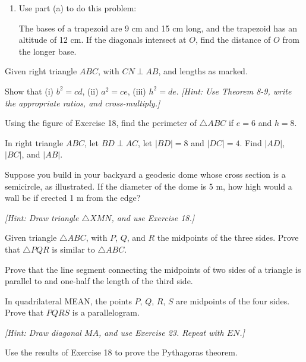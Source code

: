 \documentclass[12pt]{book} %
\begin{document}
\begin{ExerciseList}
\begin{enumerate}
\item[(b)] Use part (a) to do this problem:

The bases of a trapezoid are 9 cm and 15 cm long, and the trapezoid has an altitude of 12 cm. If the diagonals intersect at $O$, find the distance of $O$ from the longer base.
\end{enumerate}


\Exercise Given right triangle $ABC$, with $CN\perp AB$, and lengths as marked.


Show that (i) $b^2=cd$, (ii) $a^2=ce$, (iii) $h^2=de$. \textit{[Hint: Use Theorem 8-9, write the appropriate ratios, and cross-multiply.]}

\Exercise Using the figure of Exercise 18, find the perimeter of $\triangle ABC$ if $e=6$ and $h=8$.

\Exercise In right triangle $ABC$, let $BD\perp AC$, let $|BD|=8$ and $|DC|=4$. Find $|AD|$, $|BC|$, and $|AB|$.


\Exercise Suppose you build in your backyard a geodesic dome whose cross section is a semicircle, as illustrated. If the diameter of the dome is 5 m, how high would a wall be if erected 1 m from the edge?


\textit{[Hint: Draw triangle $\triangle XMN$, and use Exercise 18.]}

\Exercise Given triangle $\triangle ABC$, with $P$, $Q$, and $R$ the midpoints of the three sides. Prove that $\triangle PQR$ is similar to $\triangle ABC$.


\Exercise Prove that the line segment connecting the midpoints of two sides of a triangle is parallel to and one-half the length of the third side.

\Exercise In quadrilateral MEAN, the points $P$, $Q$, $R$, $S$ are midpoints of the four sides. Prove that $PQRS$ is a parallelogram.


\textit{[Hint: Draw diagonal $MA$, and use Exercise 23. Repeat with $EN$.]}

\Exercise Use the results of Exercise 18 to prove the Pythagoras theorem.
\end{ExerciseList}
\end{document}
